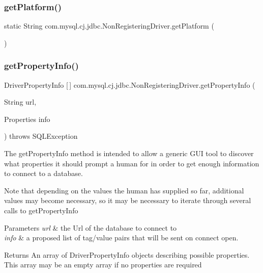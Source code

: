 \subsubsection{\texorpdfstring{get\+Platform()}{getPlatform()}}
{\footnotesize\ttfamily static String com.\+mysql.\+cj.\+jdbc.\+Non\+Registering\+Driver.\+get\+Platform (\begin{DoxyParamCaption}{ }\end{DoxyParamCaption})\hspace{0.3cm}{\ttfamily [static]}}

\mbox{\label{classcom_1_1mysql_1_1cj_1_1jdbc_1_1_non_registering_driver_ad132531e673998633349a65c4c3eb402}} 
\subsubsection{\texorpdfstring{get\+Property\+Info()}{getPropertyInfo()}}
{\footnotesize\ttfamily Driver\+Property\+Info \mbox{[}$\,$\mbox{]} com.\+mysql.\+cj.\+jdbc.\+Non\+Registering\+Driver.\+get\+Property\+Info (\begin{DoxyParamCaption}\item[{String}]{url,  }\item[{Properties}]{info }\end{DoxyParamCaption}) throws S\+Q\+L\+Exception}

The get\+Property\+Info method is intended to allow a generic G\+UI tool to discover what properties it should prompt a human for in order to get enough information to connect to a database.

Note that depending on the values the human has supplied so far, additional values may become necessary, so it may be necessary to iterate through several calls to get\+Property\+Info 


\begin{DoxyParams}{Parameters}
{\em url} & the Url of the database to connect to \\
\hline
{\em info} & a proposed list of tag/value pairs that will be sent on connect open.\\
\hline
\end{DoxyParams}
\begin{DoxyReturn}{Returns}
An array of Driver\+Property\+Info objects describing possible properties. This array may be an empty array if no properties are required
\end{DoxyReturn}

